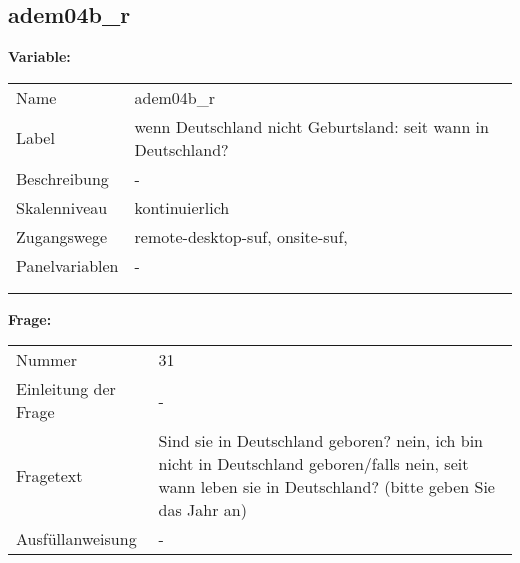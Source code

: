 	
	
	\subsection{adem04b\_r}
	\label{subSection:adem04b_r}

	\noindent\textbf{Variable:}\\
		\begin{tabular}{lL{11.3cm}}
			\label{tableVariable:adem04b_r}
			Name & adem04b\_r \\
			Label & wenn Deutschland nicht Geburtsland: seit wann in Deutschland? \\
			Beschreibung & - \\
			Skalenniveau & kontinuierlich \\
			Zugangswege &
				remote-desktop-suf,
				onsite-suf,
 \\
			Panelvariablen & -
			 \\
			 \\
 \\
		\end{tabular}

		\vspace*{1 cm}
		\noindent\textbf{Frage:}\\
		\begin{tabular}{lL{11.3cm}}
			\label{tableQuestion:adem04b_r}
			Nummer & 31 \\
			Einleitung der Frage & - \\
			Fragetext & Sind sie in Deutschland geboren?
nein, ich bin nicht in Deutschland geboren/falls nein, seit wann leben sie in Deutschland? (bitte geben Sie das Jahr an) \\
			Ausfüllanweisung & - \\
		\end{tabular}




